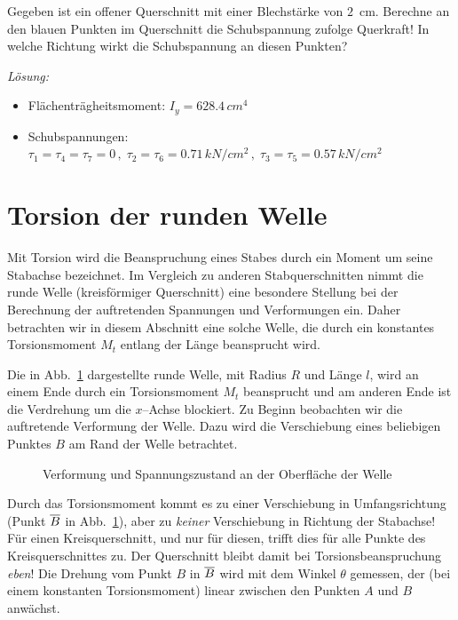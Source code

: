 \begin{example}
%
Gegeben ist ein offener Querschnitt mit einer Blechstärke von $2\,$ cm.
Berechne an den blauen Punkten im Querschnitt die Schubspannung zufolge Querkraft!
In welche Richtung wirkt die Schubspannung an diesen Punkten?
%
\begin{center}
	
\end{center}
%	

\textit{Lösung:}
\begin{itemize}
	\item Flächenträgheitsmoment: $I_y = 628.4\,\unit{cm^4}$
	\item Schubspannungen: $\tau_1 = \tau_4 = \tau_7 = 0\,,\;  \tau_2 = \tau_6 = 0.71\,\unit{kN/cm^2}\,,\; \tau_3=\tau_5=0.57\,\unit{kN/cm^2}$
\end{itemize}
\end{example}



\section{Torsion der runden Welle}

Mit Torsion wird die Beanspruchung eines Stabes durch ein Moment um seine Stabachse bezeichnet.
Im Vergleich zu anderen Stabquerschnitten nimmt die runde Welle (kreisförmiger Querschnitt) eine besondere Stellung bei der Berechnung der auftretenden Spannungen und Verformungen ein.
Daher betrachten wir in diesem Abschnitt eine solche Welle, die durch ein konstantes Torsionsmoment $M_t$ entlang der Länge beansprucht wird.

Die in Abb.~\ref{fig:4-4} dargestellte runde Welle, mit Radius $R$ und Länge $l$, wird an einem Ende durch ein Torsionsmoment $M_t$ beansprucht und am anderen Ende ist die Verdrehung um die $x$--Achse blockiert.
Zu Beginn beobachten wir die auftretende Verformung der Welle.
Dazu wird die Verschiebung eines beliebigen Punktes $B$ am Rand der Welle betrachtet. 
%
\begin{figure}[h!]
	\centering
	
	\caption{Verformung und Spannungszustand an der Oberfläche der Welle}
	\label{fig:4-4}
\end{figure}
%
Durch das Torsionsmoment kommt es zu einer Verschiebung in Umfangsrichtung (Punkt $\overline{B}$ in Abb.~\ref{fig:4-4}), aber zu \emph{keiner} Verschiebung in Richtung der Stabachse!
Für einen Kreisquerschnitt, und nur für diesen, trifft dies für alle Punkte des Kreisquerschnittes zu.
Der Querschnitt bleibt damit bei Torsionsbeanspruchung \emph{eben}!
Die Drehung vom Punkt $B$ in $\overline{B}$ wird mit dem Winkel $\theta$ gemessen, der (bei einem konstanten Torsionsmoment) linear zwischen den Punkten $A$ und $B$ anwächst.

